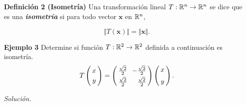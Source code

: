 
\subsection{}

\begin{frame}%
	
	
	\begin{block}{\textbf{Definición 2 (Isometría) }}
		\justifying
		Una transformación lineal $T:\mathbb{R}^n\to \mathbb{R}^n$ se dice que es una \textbf{\textit{isometría}} si para 
		todo vector $\mathbf{x}$ en $\mathbb{R}^n$,
		
		\vspace{-4mm}
		\[
		\Vert T(\mathbf{x})\Vert = \Vert \mathbf{x}\Vert.
		\]
	\end{block}
	
	\begin{ej}{\textbf{Ejemplo 3}}
		\justifying
		Determine si función $T:\mathbb{R}^2\to \mathbb{R}^2$ definida a continuación es isometría.
		\[
		T
		\left(
		\begin{array}{@{\hspace{0.3\tabcolsep}}c@{\hspace{0.3\tabcolsep}}}
		x \\[1mm]
		y
		\end{array}
		\right)
		= 
		\left(
		\begin{array}{@{\hspace{0.3\tabcolsep}}r@{\hspace{1.2\tabcolsep}}r@{\hspace{0.3\tabcolsep}}}
		\frac{\sqrt{2}}{2} & -\frac{\sqrt{2}}{2} \\[1mm]
		\frac{\sqrt{2}}{2} & \frac{\sqrt{2}}{2} 
		\end{array}
		\right)
		\left(
		\begin{array}{@{\hspace{0.3\tabcolsep}}c@{\hspace{0.3\tabcolsep}}}
		x \\[2mm]
		y
		\end{array}
		\right).
		\]		
	\end{ej}
	\textit{Solución.}
	
\end{frame}

